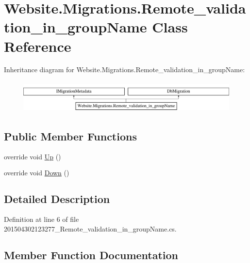 \hypertarget{class_website_1_1_migrations_1_1_remote__validation__in__group_name}{}\section{Website.\+Migrations.\+Remote\+\_\+validation\+\_\+in\+\_\+group\+Name Class Reference}
\label{class_website_1_1_migrations_1_1_remote__validation__in__group_name}
Inheritance diagram for Website.\+Migrations.\+Remote\+\_\+validation\+\_\+in\+\_\+group\+Name\+:\begin{figure}[H]
\begin{center}
\leavevmode
\includegraphics[height=1.739130cm]{class_website_1_1_migrations_1_1_remote__validation__in__group_name}
\end{center}
\end{figure}
\subsection*{Public Member Functions}
\begin{DoxyCompactItemize}
\item 
override void \hyperlink{class_website_1_1_migrations_1_1_remote__validation__in__group_name_a32da7decd98b8f07e994cb4e3e8fb8b4}{Up} ()
\item 
override void \hyperlink{class_website_1_1_migrations_1_1_remote__validation__in__group_name_a2febe3e740d3b6004fd6c537a1cc677f}{Down} ()
\end{DoxyCompactItemize}


\subsection{Detailed Description}


Definition at line 6 of file 201504302123277\+\_\+\+Remote\+\_\+validation\+\_\+in\+\_\+group\+Name.\+cs.



\subsection{Member Function Documentation}
\hypertarget{class_website_1_1_migrations_1_1_remote__validation__in__group_name_a2febe3e740d3b6004fd6c537a1cc677f}{}
